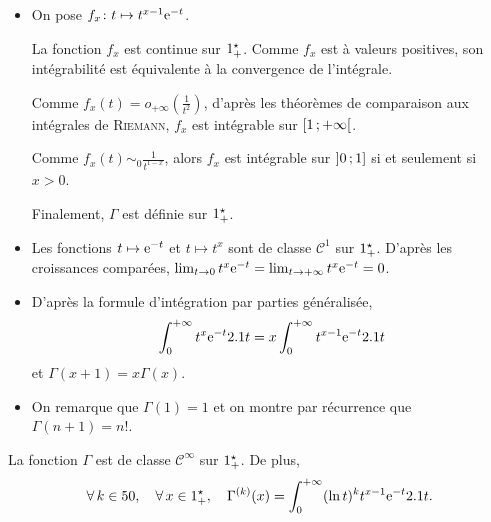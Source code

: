 \begin{demo}
\begin{itemize}
\item On pose $\fonctionligne[f_x]{t}{t^{x - 1} \e^{-t}}$.

La fonction $f_x$ est continue sur $\R_+^\star$. Comme $f_x$ est à valeurs positives, son intégrabilité est équivalente à la convergence de l'intégrale.

Comme $f_x(t) = o_{+\infty}\mathopen{}\left(\frac{1}{t^2}\right)$, d'après les théorèmes de comparaison aux intégrales de \textsc{Riemann}, $f_x$ est intégrable sur $\interfo{1}{+\infty}$.

Comme $f_x(t) \sim_0 \frac{1}{t^{1-x}}$, alors $f_x$ est intégrable sur $\interof{0}{1}$ si et seulement si $x > 0$.

Finalement, $\Gamma$ est définie sur $\R_+^\star$.

\item Les fonctions $t \mapsto \e^{-t}$ et $t \mapsto t^x$ sont de classe $\mathscr{C}^1$ sur $\R_+^\star$. D'après les croissances comparées, $\lim_{t\to0} t^x \e^{-t} = \lim_{t\to+\infty} t^x \e^{-t} = 0$. \item {}D'après la formule d'intégration par parties généralisée,
\[
\int_0^{+\infty} t^x \e^{-t} \d t = x \int_0^{+\infty} t^{x-1} \e^{-t} \d t
\]
et $\Gamma(x+1) = x \Gamma(x)$.

\item On remarque que $\Gamma(1) = 1$ et on montre par récurrence que $\Gamma(n+1) = n!$.
\end{itemize}
\end{demo}



\begin{theo}[Régularité]
La fonction $\Gamma$ est de classe $\mathscr{C}^\infty$ sur $\Rpe$. De plus,
\[
\forall k \in \N,\quad \forall x \in \R_+^\star,\quad \Gamma^{(k)}(x) = \int_{0}^{+\infty} (\ln t)^k t^{x-1} \e^{-t} \d t.
\]
\end{theo}


